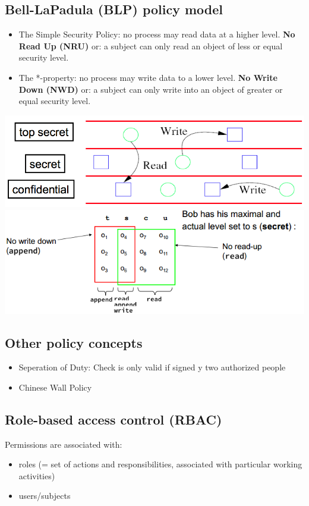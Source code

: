\documentclass[10pt]{article}
\begin{document}
\subsection{Bell-LaPadula (BLP) policy model }
\begin{itemize}
	\item The Simple Security Policy: no process may read data at a higher level. \textbf{No Read Up (NRU)} or: a subject can only read an object of less or equal security level.
	\item The *-property: no process may write data to a lower level. \textbf{No Write Down (NWD) }or: a subject can only write into an object of greater or equal security level.
\end{itemize}
\begin{center}
	\includegraphics[scale=0.4]{bell-la_padula.png}
	\includegraphics[scale=0.4]{bell-la_padula_eg.png}
\end{center}
\subsection{Other policy concepts}
\begin{itemize}
	\item Seperation of Duty: Check is only valid if signed y two authorized people
	\item Chinese Wall Policy
\end{itemize}
\subsection{Role-based access control (RBAC)}
Permissions are associated with:
\begin{itemize}
	\item roles  (= set of actions and responsibilities, associated with particular 
working activities)
	\item users/subjects
\end{itemize}
\end{document}
